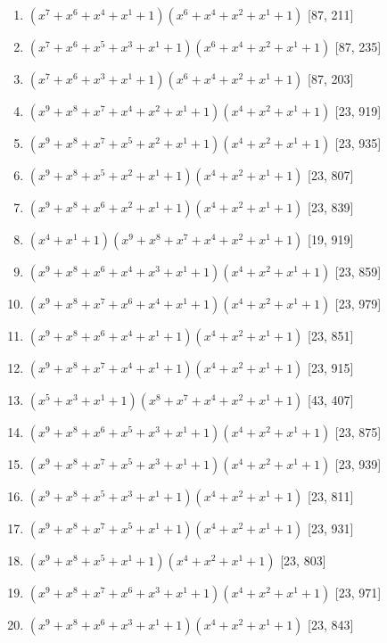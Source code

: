 \documentclass[10pt,twocolumn]{article}
\begin{document}
\begin{enumerate}
\item $(x^{7} + x^{6} + x^{4} + x^{1} + 1)(x^{6} + x^{4} + x^{2} + x^{1} + 1)$  [87, 211]
\item $(x^{7} + x^{6} + x^{5} + x^{3} + x^{1} + 1)(x^{6} + x^{4} + x^{2} + x^{1} + 1)$  [87, 235]
\item $(x^{7} + x^{6} + x^{3} + x^{1} + 1)(x^{6} + x^{4} + x^{2} + x^{1} + 1)$  [87, 203]
\item $(x^{9} + x^{8} + x^{7} + x^{4} + x^{2} + x^{1} + 1)(x^{4} + x^{2} + x^{1} + 1)$  [23, 919]
\item $(x^{9} + x^{8} + x^{7} + x^{5} + x^{2} + x^{1} + 1)(x^{4} + x^{2} + x^{1} + 1)$  [23, 935]
\item $(x^{9} + x^{8} + x^{5} + x^{2} + x^{1} + 1)(x^{4} + x^{2} + x^{1} + 1)$  [23, 807]
\item $(x^{9} + x^{8} + x^{6} + x^{2} + x^{1} + 1)(x^{4} + x^{2} + x^{1} + 1)$  [23, 839]
\item $(x^{4} + x^{1} + 1)(x^{9} + x^{8} + x^{7} + x^{4} + x^{2} + x^{1} + 1)$  [19, 919]
\item $(x^{9} + x^{8} + x^{6} + x^{4} + x^{3} + x^{1} + 1)(x^{4} + x^{2} + x^{1} + 1)$  [23, 859]
\item $(x^{9} + x^{8} + x^{7} + x^{6} + x^{4} + x^{1} + 1)(x^{4} + x^{2} + x^{1} + 1)$  [23, 979]
\item $(x^{9} + x^{8} + x^{6} + x^{4} + x^{1} + 1)(x^{4} + x^{2} + x^{1} + 1)$  [23, 851]
\item $(x^{9} + x^{8} + x^{7} + x^{4} + x^{1} + 1)(x^{4} + x^{2} + x^{1} + 1)$  [23, 915]
\item $(x^{5} + x^{3} + x^{1} + 1)(x^{8} + x^{7} + x^{4} + x^{2} + x^{1} + 1)$  [43, 407]
\item $(x^{9} + x^{8} + x^{6} + x^{5} + x^{3} + x^{1} + 1)(x^{4} + x^{2} + x^{1} + 1)$  [23, 875]
\item $(x^{9} + x^{8} + x^{7} + x^{5} + x^{3} + x^{1} + 1)(x^{4} + x^{2} + x^{1} + 1)$  [23, 939]
\item $(x^{9} + x^{8} + x^{5} + x^{3} + x^{1} + 1)(x^{4} + x^{2} + x^{1} + 1)$  [23, 811]
\item $(x^{9} + x^{8} + x^{7} + x^{5} + x^{1} + 1)(x^{4} + x^{2} + x^{1} + 1)$  [23, 931]
\item $(x^{9} + x^{8} + x^{5} + x^{1} + 1)(x^{4} + x^{2} + x^{1} + 1)$  [23, 803]
\item $(x^{9} + x^{8} + x^{7} + x^{6} + x^{3} + x^{1} + 1)(x^{4} + x^{2} + x^{1} + 1)$  [23, 971]
\item $(x^{9} + x^{8} + x^{6} + x^{3} + x^{1} + 1)(x^{4} + x^{2} + x^{1} + 1)$  [23, 843]

\end{enumerate}
\end{document}
